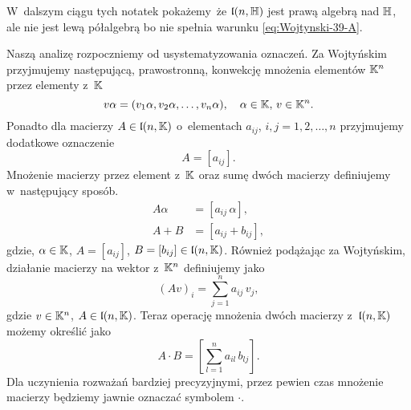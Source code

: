\documentclass[a4paper,11pt]{article}
\begin{document}
W~dalszym ciągu tych notatek pokażemy~że $\mathfrak{l}( n, \mathbb{H} )$ jest prawą
algebrą nad $\mathbb{H}$, ale nie jest lewą półalgebrą bo nie spełnia warunku
\eqref{eq:Wojtynski-39-A}.

Naszą analizę rozpoczniemy od usystematyzowania oznaczeń. Za Wojtyńskim
przyjmujemy następującą, prawostronną, konwekcję mnożenia elementów
$\mathbb{K}^{ n }$ przez elementy z~$\mathbb{K}$
\begin{equation}
  \label{eq:Wojtynski-40}
  v \alpha = ( v_{ 1 } \alpha, v_{ 2 } \alpha, \ldots, v_{ n } \alpha ), \quad
  \alpha \in \mathbb{K}, \, v \in \mathbb{K}^{ n }.
\end{equation}
Ponadto dla macierzy $A \in \mathfrak{l}( n, \mathbb{K} )$ o~elementach $a_{ ij }$,
$i, j = 1, 2, \ldots, n$ przyjmujemy dodatkowe oznaczenie
\begin{equation}
  \label{eq:Wojtynski-41}
  A = [ a_{ i j } ].
\end{equation}
Mnożenie macierzy przez element z~$\mathbb{K}$ oraz sumę dwóch macierzy
definiujemy w~następujący sposób.
\begin{subequations}
  \begin{align}
    \label{eq:Wojtynski-42-A}
    A \alpha &= [ a_{ i j } \, \alpha ], \\
    \label{eq:Wojtynski-42-B}
    A + B &= [ a_{ i j } + b_{ i j } ],
  \end{align}
\end{subequations}
gdzie, $\alpha \in \mathbb{K}$, $A = [ a_{ i j } ]$,
$B = [ b_{ i j } ] \in \mathfrak{l}( n, \mathbb{K} )$.
Również podążając za Wojtyńskim, działanie macierzy na wektor z~$\mathbb{K}^{ n }$
definiujemy jako
\begin{equation}
  \label{eq:Wojtynski-43}
  ( A v )_{ i } = \sum_{ j = 1 }^{ n } a_{ i j } \, v_{ j },
\end{equation}
gdzie $v \in \mathbb{K}^{ n }$, $A \in \mathfrak{l}( n, \mathbb{K} )$. Teraz operację mnożenia
dwóch macierzy z~$\mathfrak{l}( n, \mathbb{K} )$ możemy określić jako
\begin{equation}
  \label{eq:Wojtynski-44}
  A \cdot B = \left[ \sum_{ l = 1 }^{ n } a_{ i l } \, b_{ l j } \right].
\end{equation}
Dla uczynienia rozważań bardziej precyzyjnymi, przez pewien czas mnożenie
macierzy będziemy jawnie oznaczać symbolem $\cdot$.
\end{document}
